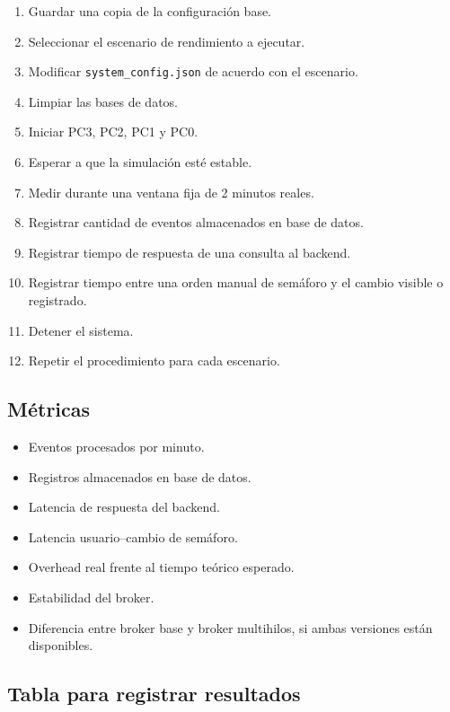 \documentclass[12pt, a4paper]{article}
\begin{document}
\begin{enumerate}
    \item Guardar una copia de la configuración base.
    \item Seleccionar el escenario de rendimiento a ejecutar.
    \item Modificar \texttt{system\_config.json} de acuerdo con el escenario.
    \item Limpiar las bases de datos.
    \item Iniciar PC3, PC2, PC1 y PC0.
    \item Esperar a que la simulación esté estable.
    \item Medir durante una ventana fija de 2 minutos reales.
    \item Registrar cantidad de eventos almacenados en base de datos.
    \item Registrar tiempo de respuesta de una consulta al backend.
    \item Registrar tiempo entre una orden manual de semáforo y el cambio visible o registrado.
    \item Detener el sistema.
    \item Repetir el procedimiento para cada escenario.
\end{enumerate}

\subsection{Métricas}

\begin{itemize}
    \item Eventos procesados por minuto.
    \item Registros almacenados en base de datos.
    \item Latencia de respuesta del backend.
    \item Latencia usuario--cambio de semáforo.
    \item Overhead real frente al tiempo teórico esperado.
    \item Estabilidad del broker.
    \item Diferencia entre broker base y broker multihilos, si ambas versiones están disponibles.
\end{itemize}

\subsection{Tabla para registrar resultados}
\end{document}
